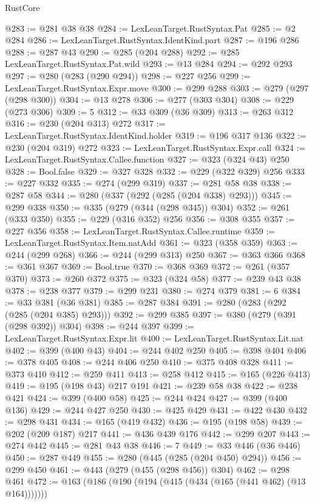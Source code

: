 \begin{lexlean}{RustCore}
\begin{coremodule}
@283 := @281 @38 @38
@284 := LexLeanTarget.RustSyntax.Pat
@285 := @2 @284
@286 := LexLeanTarget.RustSyntax.IdentKind.part
@287 := @196 @286
@288 := @287 @43
@290 := @285 (@204 @288)
@292 := @285 LexLeanTarget.RustSyntax.Pat.wild
@293 := @13 @284
@294 := @292 @293
@297 := @280 (@283 (@290 @294))
@298 := @227 @256
@299 := LexLeanTarget.RustSyntax.Expr.move
@300 := @299 @288
@303 := @279 (@297 (@298 @300))
@304 := @13 @278
@306 := @277 (@303 @304)
@308 := @229 (@273 @306)
@309 := 5
@312 := @33 @309 (@36 @309)
@313 := @263 @312
@316 := @230 (@204 @313) @272
@317 := LexLeanTarget.RustSyntax.IdentKind.holder
@319 := @196 @317 @136
@322 := @230 (@204 @319) @272
@323 := LexLeanTarget.RustSyntax.Expr.call
@324 := LexLeanTarget.RustSyntax.Callee.function
@327 := @323 (@324 @43) @250
@328 := Bool.false
@329 := @327 @328
@332 := @229 (@322 @329) @256
@333 := @227 @332
@335 := @274 (@299 @319)
@337 := @281 @58 @38
@338 := @287 @58
@344 := @280 (@337 (@292 (@285 (@204 @338) @293)))
@345 := @299 @338
@350 := @335 (@279 (@344 (@298 @345)) @304)
@352 := @261 (@333 @350)
@355 := @229 (@316 @352) @256
@356 := @308 @355
@357 := @227 @356
@358 := LexLeanTarget.RustSyntax.Callee.runtime
@359 := LexLeanTarget.RustSyntax.Item.natAdd
@361 := @323 (@358 @359)
@363 := @244 (@299 @268)
@366 := @244 (@299 @313) @250
@367 := @363 @366
@368 := @361 @367
@369 := Bool.true
@370 := @368 @369
@372 := @261 (@357 @370)
@373 := @260 @372
@375 := @323 (@324 @58)
@377 := @239 @43 @38
@378 := @238 @377
@379 := @299 @231
@380 := @274 @379
@381 := 6
@384 := @33 @381 (@36 @381)
@385 := @287 @384
@391 := @280 (@283 (@292 (@285 (@204 @385) @293)))
@392 := @299 @385
@397 := @380 (@279 (@391 (@298 @392)) @304)
@398 := @244 @397
@399 := LexLeanTarget.RustSyntax.Expr.lit
@400 := LexLeanTarget.RustSyntax.Lit.nat
@402 := @399 (@400 @43)
@404 := @244 @402 @250
@405 := @398 @404
@406 := @378 @405
@408 := @244 @406 @250
@410 := @375 @408 @328
@411 := @373 @410
@412 := @259 @411
@413 := @258 @412
@415 := @165 (@226 @413)
@419 := @195 (@198 @43) @217 @191
@421 := @239 @58 @38
@422 := @238 @421
@424 := @399 (@400 @58)
@425 := @244 @424
@427 := @399 (@400 @136)
@429 := @244 @427 @250
@430 := @425 @429
@431 := @422 @430
@432 := @298 @431
@434 := @165 (@419 @432)
@436 := @195 (@198 @58)
@439 := @202 (@209 @187) @217
@441 := @436 @439 @176
@442 := @299 @207
@443 := @274 @442
@445 := @281 @43 @38
@446 := 7
@449 := @33 @446 (@36 @446)
@450 := @287 @449
@455 := @280 (@445 (@285 (@204 @450) @294))
@456 := @299 @450
@461 := @443 (@279 (@455 (@298 @456)) @304)
@462 := @298 @461
@472 := @163 (@186 (@190 (@194 (@415 (@434 (@165 (@441 @462) (@13 @164)))))))

\end{coremodule}
\end{lexlean}

